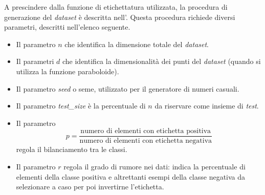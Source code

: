 A prescindere dalla funzione di etichettatura utilizzata, la procedura di generazione del \emph{dataset} è descritta nell'.
Questa procedura richiede diversi parametri, descritti nell'elenco seguente.
\begin{itemize}
    \item Il parametro $n$ che identifica la dimensione totale del \emph{dataset}.
    \item Il parametri $d$ che identifica la dimensionalità dei punti del \emph{dataset} (quando si utilizza la funzione paraboloide). 
    \item Il parametro \emph{seed} o seme, utilizzato per il generatore di numeri casuali.
    \item Il parametro \emph{test\_size} è la percentuale di $n$ da riservare come insieme di \emph{test}.
    \item Il parametro 
    \begin{equation*}
        p = \frac{\text{numero di elementi con etichetta positiva}}{\text{numero di elementi con etichetta negativa}}
    \end{equation*} 
    regola il bilanciamento tra le classi.
    \item Il parametro $r$ regola il grado di rumore nei dati: indica la percentuale di elementi della classe positiva e altrettanti esempi della classe negativa da selezionare a caso per poi invertirne l'etichetta.
\end{itemize}
